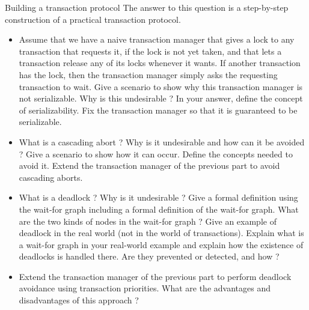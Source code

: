 \begin{Q3}{Building a transaction protocol}
  The answer to this question is a step-by-step construction of a practical transaction protocol.

  \begin{itemize}
    \item Assume that we have a naive transaction manager that gives a lock to any transaction
      that requests it, if the lock is not yet taken, and that lets a transaction release any of
      its locks whenever it wants. If another transaction has the lock, then the transaction
      manager simply asks the requesting transaction to wait. Give a scenario to show why this
      transaction manager is not serializable. Why is this undesirable ? In your answer, define
      the concept of serializability. Fix the transaction manager so that it is guaranteed to be
      serializable.
    \item What is a cascading abort ? Why is it undesirable and how can it be avoided ? Give a
      scenario to show how it can occur. Define the concepts needed to avoid it. Extend the
      transaction manager of the previous part to avoid cascading aborts.
    \item What is a deadlock ? Why is it undesirable ? Give a formal definition using the wait-for
      graph including a formal definition of the wait-for graph. What are the two kinds of nodes
      in the wait-for graph ? Give an example of deadlock in the real world (not in the world
      of transactions). Explain what is a wait-for graph in your real-world example and explain
      how the existence of deadlocks is handled there. Are they prevented or detected, and how ?
    \item Extend the transaction manager of the previous part to perform deadlock avoidance using
      transaction priorities. What are the advantages and disadvantages of this approach ?
  \end{itemize}
\end{Q3}



